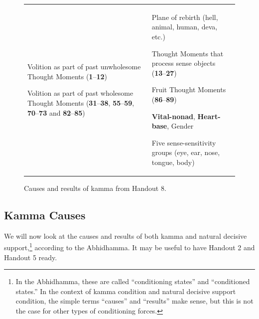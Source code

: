 \begin{figure}[H]

\begin{tabular*}{\textwidth}{L{\tabcolsep} | L{\tabcolsep}}
\toprule
{} &  \\
\midrule

Volition as part of past unwholesome Thought Moments (\textbf{1}--\textbf{12})

\vspace{2mm}

Volition as part of past wholesome Thought Moments (\textbf{31}--\textbf{38}, \textbf{55}--\textbf{59}, \textbf{70}--\textbf{73} and \textbf{82}--\textbf{85})
&
Plane of rebirth (hell, animal, human, deva, etc.)

\vspace{2mm}

Thought Moments that process sense objects (\textbf{13}--\textbf{27})

\vspace{2mm}

Fruit Thought Moments (\textbf{86}--\textbf{89})

\vspace{2mm}

\textbf{Vital-nonad}, \textbf{Heart-base}, Gender
\vspace{2mm}

Five sense-sensitivity groups (eye, ear, nose, tongue, body)
  \\
  
\bottomrule
\end{tabular*}
\caption{Causes and results of kamma from Handout 8.}
\label{fig:Kamma}
\end{figure}

\subsection*{Kamma Causes}

We will now look at the causes and results of both kamma and natural decisive support,\footnote{In the Abhidhamma, these are called “conditioning states” and “conditioned states.” In the context of kamma condition and natural decisive support condition, the simple terms “causes” and “results” make sense, but this is not the case for other types of conditioning forces.} according to the Abhidhamma. It may be useful to have Handout 2 and Handout 5 ready.

